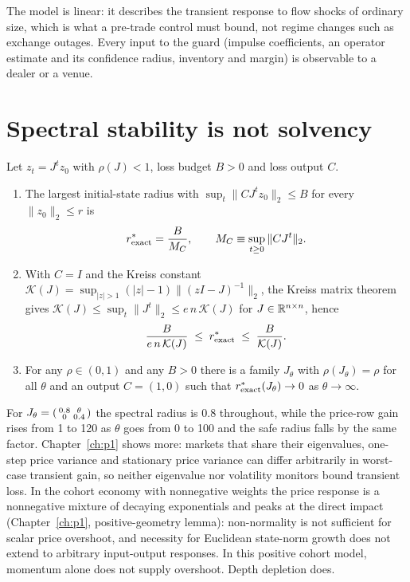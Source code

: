     The model is linear: it describes the transient response to flow shocks of ordinary size, which is what a pre-trade control must bound, not regime changes such as exchange outages. Every input to the guard (impulse coefficients, an operator estimate and its confidence radius, inventory and margin) is observable to a dealer or a venue.

    \section{Spectral stability is not solvency}\label{p2:sec:radius}
    
\begin{theorem}\label{p2:thm:radius}
Let $z_t=J^tz_0$ with $\rho(J)<1$, loss budget $B>0$ and loss output $C$.
\begin{enumerate}[label=(\roman*)]
\item The largest initial-state radius with $\sup_t\|CJ^tz_0\|_2\le B$ for every $\|z_0\|_2\le r$ is
\begin{equation}\label{p2:eq:rexact}
r^*_{\rm exact}=\frac{B}{M_C},\qquad M_C\equiv\sup_{t\ge0}\|CJ^t\|_2 .
\end{equation}
\item With $C=I$ and the Kreiss constant $\mathcal K(J)=\sup_{|z|>1}(|z|-1)\|(zI-J)^{-1}\|_2$, the Kreiss matrix theorem gives $\mathcal K(J)\le\sup_t\|J^t\|_2\le e\,n\,\mathcal K(J)$ for $J\in\mathbb{R}^{n\times n}$, hence
\begin{equation}\label{p2:eq:kreiss}
\frac{B}{e\,n\,\mathcal K(J)}\;\le\;r^*_{\rm exact}\;\le\;\frac{B}{\mathcal K(J)} .
\end{equation}
\item For any $\rho\in(0,1)$ and any $B>0$ there is a family $J_\theta$ with $\rho(J_\theta)=\rho$ for all $\theta$ and an output $C=(1,0)$ such that $r^*_{\rm exact}(J_\theta)\to0$ as $\theta\to\infty$.
\end{enumerate}
\end{theorem}

    For $J_\theta=\begin{psmallmatrix}0.8&\theta\\0&0.4\end{psmallmatrix}$ the spectral radius is $0.8$ throughout, while the price-row gain rises from 1 to 120 as $\theta$ goes from 0 to 100 and the safe radius falls by the same factor. Chapter~\ref{ch:p1} shows more: markets that share their eigenvalues, one-step price variance and stationary price variance can differ arbitrarily in worst-case transient gain, so neither eigenvalue nor volatility monitors bound transient loss. In the cohort economy with nonnegative weights the price response is a nonnegative mixture of decaying exponentials and peaks at the direct impact (Chapter~\ref{ch:p1}, positive-geometry lemma): non-normality is not sufficient for scalar price overshoot, and necessity for Euclidean state-norm growth does not extend to arbitrary input-output responses. In this positive cohort model, momentum alone does not supply overshoot. Depth depletion does.

